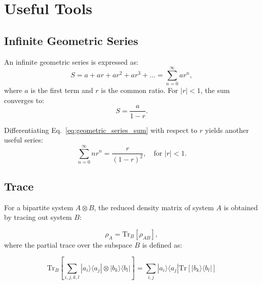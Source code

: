 \section{Useful Tools}

\subsection{Infinite Geometric Series}
An infinite geometric series is expressed as:
\begin{equation} \label{eq:infinite_geometric_series}
	S = a + ar + ar^2 + ar^3 + \dots = \sum_{n=0}^{\infty} ar^n,
\end{equation}
where \(a\) is the first term and \(r\) is the common ratio. For \(|r| < 1\), the sum converges to:
\begin{equation} \label{eq:geometric_series_sum}
	S = \frac{a}{1 - r}.
\end{equation}

Differentiating Eq.~\eqref{eq:geometric_series_sum} with respect to \( r \) yields another useful series:
\begin{equation} \label{eq:derivation_geometric_sum}
	\sum_{n=0}^{\infty} n r^n = \frac{r}{(1-r)^2}, \quad \text{for } |r| < 1.
\end{equation}


\subsection{Trace}
For a bipartite system \( A \otimes B \), the reduced density matrix of system \( A \) is obtained by tracing out system \( B \):

\begin{equation} \label{eq:partial_trace}
	\rho_A = \mathrm{Tr}_B[\rho_{AB}],
\end{equation}
where the partial trace over the subspace \( B \) is defined as:

\begin{equation} \label{eq:partial_trace_definition}
	\mathrm{Tr}_B\left[\sum_{i,j,k,l} | a_i \rangle \langle a_j | \otimes | b_k \rangle \langle b_l | \right] = \sum_{i,j} | a_i \rangle \langle a_j | \mathrm{Tr}\left[ | b_k \rangle \langle b_l | \right]
\end{equation}

